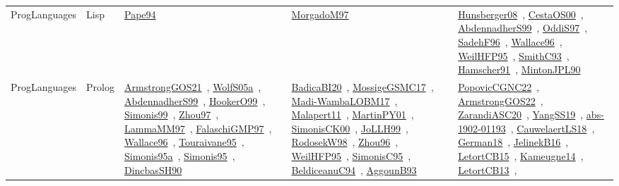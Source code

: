 {\begin{longtable}{lp{3cm}>{\raggedright\arraybackslash}p{6cm}>{\raggedright\arraybackslash}p{6cm}>{\raggedright\arraybackslash}p{8cm}}
ProgLanguages & Lisp & \href{../works/Pape94.pdf}{Pape94}~\cite{Pape94} & \href{../works/MorgadoM97.pdf}{MorgadoM97}~\cite{MorgadoM97} & \href{../works/Hunsberger08.pdf}{Hunsberger08}~\cite{Hunsberger08}, \href{../works/CestaOS00.pdf}{CestaOS00}~\cite{CestaOS00}, \href{../works/AbdennadherS99.pdf}{AbdennadherS99}~\cite{AbdennadherS99}, \href{../works/OddiS97.pdf}{OddiS97}~\cite{OddiS97}, \href{../works/SadehF96.pdf}{SadehF96}~\cite{SadehF96}, \href{../works/Wallace96.pdf}{Wallace96}~\cite{Wallace96}, \href{../works/WeilHFP95.pdf}{WeilHFP95}~\cite{WeilHFP95}, \href{../works/SmithC93.pdf}{SmithC93}~\cite{SmithC93}, \href{../works/Hamscher91.pdf}{Hamscher91}~\cite{Hamscher91}, \href{../works/MintonJPL90.pdf}{MintonJPL90}~\cite{MintonJPL90}\\
ProgLanguages & Prolog & \href{../works/ArmstrongGOS21.pdf}{ArmstrongGOS21}~\cite{ArmstrongGOS21}, \href{../works/WolfS05a.pdf}{WolfS05a}~\cite{WolfS05a}, \href{../works/AbdennadherS99.pdf}{AbdennadherS99}~\cite{AbdennadherS99}, \href{../works/HookerO99.pdf}{HookerO99}~\cite{HookerO99}, \href{../works/Simonis99.pdf}{Simonis99}~\cite{Simonis99}, \href{../works/Zhou97.pdf}{Zhou97}~\cite{Zhou97}, \href{../works/LammaMM97.pdf}{LammaMM97}~\cite{LammaMM97}, \href{../works/FalaschiGMP97.pdf}{FalaschiGMP97}~\cite{FalaschiGMP97}, \href{../works/Wallace96.pdf}{Wallace96}~\cite{Wallace96}, \href{../works/Touraivane95.pdf}{Touraivane95}~\cite{Touraivane95}, \href{../works/Simonis95a.pdf}{Simonis95a}~\cite{Simonis95a}, \href{../works/Simonis95.pdf}{Simonis95}~\cite{Simonis95}, \href{../works/DincbasSH90.pdf}{DincbasSH90}~\cite{DincbasSH90} & \href{../works/BadicaBI20.pdf}{BadicaBI20}~\cite{BadicaBI20}, \href{../works/MossigeGSMC17.pdf}{MossigeGSMC17}~\cite{MossigeGSMC17}, \href{../works/Madi-WambaLOBM17.pdf}{Madi-WambaLOBM17}~\cite{Madi-WambaLOBM17}, \href{../works/Malapert11.pdf}{Malapert11}~\cite{Malapert11}, \href{../works/MartinPY01.pdf}{MartinPY01}~\cite{MartinPY01}, \href{../works/SimonisCK00.pdf}{SimonisCK00}~\cite{SimonisCK00}, \href{../works/JoLLH99.pdf}{JoLLH99}~\cite{JoLLH99}, \href{../works/RodosekW98.pdf}{RodosekW98}~\cite{RodosekW98}, \href{../works/Zhou96.pdf}{Zhou96}~\cite{Zhou96}, \href{../works/WeilHFP95.pdf}{WeilHFP95}~\cite{WeilHFP95}, \href{../works/SimonisC95.pdf}{SimonisC95}~\cite{SimonisC95}, \href{../works/BeldiceanuC94.pdf}{BeldiceanuC94}~\cite{BeldiceanuC94}, \href{../works/AggounB93.pdf}{AggounB93}~\cite{AggounB93} & \href{../works/PopovicCGNC22.pdf}{PopovicCGNC22}~\cite{PopovicCGNC22}, \href{../works/ArmstrongGOS22.pdf}{ArmstrongGOS22}~\cite{ArmstrongGOS22}, \href{../works/ZarandiASC20.pdf}{ZarandiASC20}~\cite{ZarandiASC20}, \href{../works/YangSS19.pdf}{YangSS19}~\cite{YangSS19}, \href{../works/abs-1902-01193.pdf}{abs-1902-01193}~\cite{abs-1902-01193}, \href{../works/CauwelaertLS18.pdf}{CauwelaertLS18}~\cite{CauwelaertLS18}, \href{../works/German18.pdf}{German18}~\cite{German18}, \href{../works/JelinekB16.pdf}{JelinekB16}~\cite{JelinekB16}, \href{../works/LetortCB15.pdf}{LetortCB15}~\cite{LetortCB15}, \href{../works/Kameugne14.pdf}{Kameugne14}~\cite{Kameugne14}, \href{../works/LetortCB13.pdf}{LetortCB13}~\cite{LetortCB13}, 
\end{longtable}}
